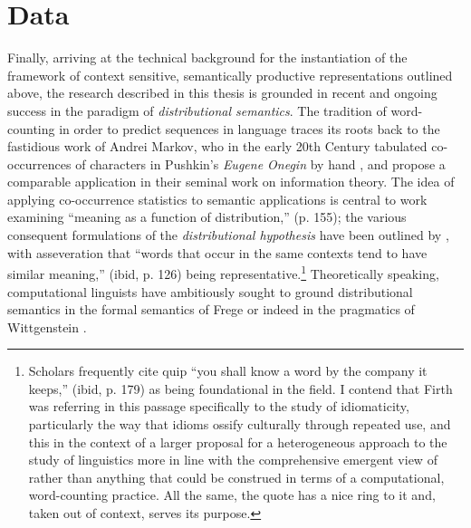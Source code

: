\section{Data} \label{sec:data}
Finally, arriving at the technical background for the instantiation of the framework of context sensitive, semantically productive representations outlined above, the research described in this thesis is grounded in recent and ongoing success in the paradigm of \emph{distributional semantics}.  The tradition of word-counting in order to predict sequences in language traces its roots back to the fastidious work of Andrei Markov, who in the early 20th Century tabulated co-occurrences of characters in Pushkin's \emph{Eugene Onegin} by hand \citep{BasharinEA2004}, and \cite{ShannonEA1949} propose a comparable application in their seminal work on information theory.  The idea of applying co-occurrence statistics to semantic applications is central to  work examining ``meaning as a function of distribution,'' (p. 155); the various consequent formulations of the \emph{distributional hypothesis} have been outlined by \cite{Sahlgren2008}, with  asseveration that ``words that occur in the same contexts tend to have similar meaning,'' (ibid, p. 126) being representative.\footnote{Scholars frequently cite  quip ``you shall know a word by the company it keeps,'' (ibid, p. 179) as being foundational in the field.  I contend that Firth was referring in this passage specifically to the study of idiomaticity, particularly the way that idioms ossify culturally through repeated use, and this in the context of a larger proposal for a heterogeneous approach to the study of linguistics more in line with the comprehensive emergent view of \cite{MacWhinney1998} rather than anything that could be construed in terms of a computational, word-counting practice.  All the same, the quote has a nice ring to it and, taken out of context, serves its purpose.}  Theoretically speaking, computational linguists have ambitiously sought to ground distributional semantics in the formal semantics of Frege \citep{BaroniEA2014b} or indeed in the pragmatics of Wittgenstein \citep{GrefenstetteEA2011}.

